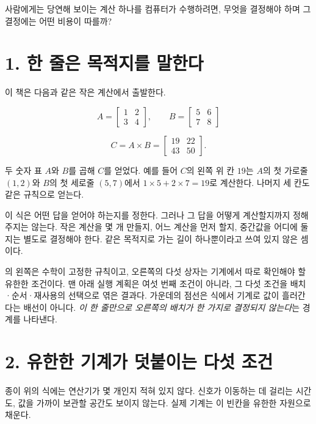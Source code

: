 \begin{objectivebox}
사람에게는 당연해 보이는 계산 하나를 컴퓨터가 수행하려면, 무엇을 결정해야 하며 그 결정에는 어떤 비용이 따를까?
\end{objectivebox}

\section*{1. 한 줄은 목적지를 말한다}

이 책은 다음과 같은 작은 계산에서 출발한다.

\[
  A=\begin{bmatrix}1&2\\3&4\end{bmatrix},
  \qquad
  B=\begin{bmatrix}5&6\\7&8\end{bmatrix}
\]

\[
  C=A\times B=
  \begin{bmatrix}19&22\\43&50\end{bmatrix}.
\]

두 숫자 표 \(A\)와 \(B\)를 곱해 \(C\)를 얻었다. 예를 들어 \(C\)의 왼쪽 위 칸 \(19\)는 \(A\)의 첫 가로줄 \((1,2)\)와 \(B\)의 첫 세로줄 \((5,7)\)에서 \(1\times5+2\times7=19\)로 계산한다. 나머지 세 칸도 같은 규칙으로 얻는다.

이 식은 어떤 답을 얻어야 하는지를 정한다. 그러나 그 답을 어떻게 계산할지까지 정해 주지는 않는다. 작은 계산을 몇 개 만들지, 어느 계산을 먼저 할지, 중간값을 어디에 둘지는 별도로 결정해야 한다. 같은 목적지로 가는 길이 하나뿐이라고 쓰여 있지 않은 셈이다.



의 왼쪽은 수학이 고정한 규칙이고, 오른쪽의 다섯 상자는 기계에서 따로 확인해야 할 유한한 조건이다. 맨 아래 실행 계획은 여섯 번째 조건이 아니라, 그 다섯 조건을 배치·순서·재사용의 선택으로 엮은 결과다. 가운데의 점선은 식에서 기계로 값이 흘러간다는 배선이 아니다. \emph{이 한 줄만으로 오른쪽의 배치가 한 가지로 결정되지 않는다}는 경계를 나타낸다.

\section*{2. 유한한 기계가 덧붙이는 다섯 조건}

종이 위의 식에는 연산기가 몇 개인지 적혀 있지 않다. 신호가 이동하는 데 걸리는 시간도, 값을 가까이 보관할 공간도 보이지 않는다. 실제 기계는 이 빈칸을 유한한 자원으로 채운다.

